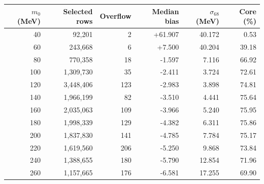 \begin{tabular}{rrrrrr}
\toprule
$m_0$ (MeV) & Selected rows & Overflow & Median bias & $\sigma_{68}$ (MeV) & Core (\%) \\
\midrule
40 & 92,201 & 2 & +61.907 & 40.172 & 0.53 \\
60 & 243,668 & 6 & +7.500 & 40.204 & 39.18 \\
80 & 770,358 & 18 & -1.597 & 7.116 & 66.92 \\
100 & 1,309,730 & 35 & -2.411 & 3.724 & 72.61 \\
120 & 3,448,406 & 123 & -2.983 & 3.898 & 74.81 \\
140 & 1,966,199 & 82 & -3.510 & 4.441 & 75.64 \\
160 & 2,035,063 & 109 & -3.966 & 5.240 & 75.95 \\
180 & 1,998,339 & 129 & -4.382 & 6.311 & 75.86 \\
200 & 1,837,830 & 141 & -4.785 & 7.784 & 75.17 \\
220 & 1,619,560 & 206 & -5.250 & 9.868 & 73.84 \\
240 & 1,388,655 & 180 & -5.790 & 12.854 & 71.96 \\
260 & 1,157,665 & 176 & -6.581 & 17.255 & 69.90 \\
\bottomrule
\end{tabular}
